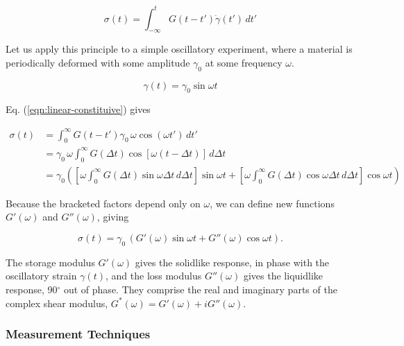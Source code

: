 \begin{equation}
  \label{eqn:linear-constituive}
  \sigma(t) = \int_{-\infty}^t G(t - t')\dot{\gamma}(t')\, dt'
\end{equation}

\noindent Let us apply this principle to a simple oscillatory experiment, where a material is periodically deformed with some amplitude $\gamma_0$ at some frequency $\omega$.

\begin{equation}
  \gamma(t) = \gamma_0 \sin \omega t
\end{equation}

\noindent Eq. (\ref{eqn:linear-constituive}) gives

\begin{equation}
  \begin{aligned}
    \sigma(t) &= \int_0^\infty G(t - t') \gamma_0\,\omega \cos(\omega t')\, dt'\\
    &= \gamma_0\,\omega \int_0^\infty G(\Delta t) \cos[\omega (t - \Delta t)]\, d\Delta t\\
    &= \gamma_0 \left(\left[\omega \int_0^\infty G(\Delta t) \sin \omega \Delta t\, d\Delta t \right] \sin \omega t + \left[\omega \int_0^\infty G(\Delta t) \cos \omega \Delta t\, d\Delta t \right] \cos \omega t \right)
  \end{aligned}
\end{equation}

Because the bracketed factors depend only on $\omega$, we can define new functions $G'(\omega)$ and $G''(\omega)$, giving

\begin{equation}
  \sigma(t) = \gamma_0\, (G'(\omega) \sin \omega t + G''(\omega) \cos \omega t).
\end{equation}

The storage modulus $G'(\omega)$ gives the solidlike response, in phase with the oscillatory strain $\gamma(t)$, and the loss modulus $G''(\omega)$ gives the liquidlike response, 90$^\circ$ out of phase. They comprise the real and imaginary parts of the complex shear modulus, $G^*(\omega) = G'(\omega) + iG''(\omega)$.

\subsubsection{Measurement Techniques}


